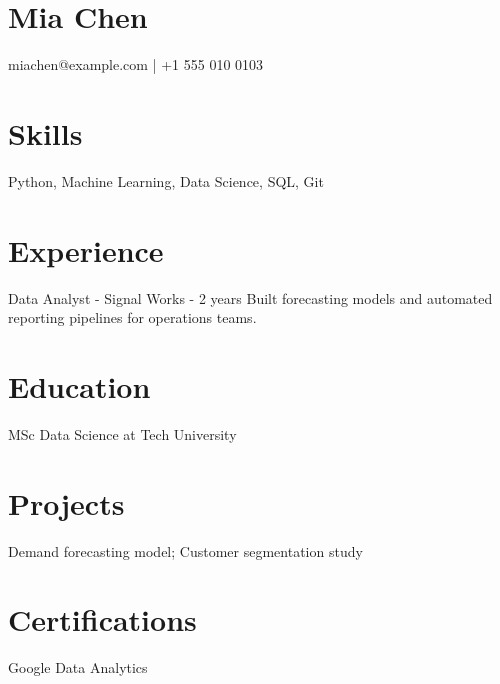 \section*{Mia Chen}
miachen@example.com | +1 555 010 0103
\section*{Skills}
Python, Machine Learning, Data Science, SQL, Git
\section*{Experience}
Data Analyst - Signal Works - 2 years
Built forecasting models and automated reporting pipelines for operations teams.
\section*{Education}
MSc Data Science at Tech University
\section*{Projects}
Demand forecasting model; Customer segmentation study
\section*{Certifications}
Google Data Analytics
